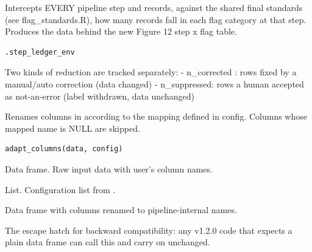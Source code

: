 \documentclass[a4paper]{book}
\begin{document}
%
\begin{Description}
Intercepts EVERY pipeline step and records, against the shared final
standards (see flag\_standards.R), how many records fall in each flag category
at that step. Produces the data behind the new Figure 12 step x flag table.
\end{Description}
%
\begin{Usage}
\begin{verbatim}
.step_ledger_env
\end{verbatim}
\end{Usage}
%
\begin{Details}
Two kinds of reduction are tracked separately:
- n\_corrected : rows fixed by a manual/auto correction (data changed)
- n\_suppressed: rows a human accepted as not-an-error (label withdrawn,
data unchanged)
\end{Details}
%
\begin{Description}
Renames columns in  according to the mapping defined in config.
Columns whose mapped name is NULL are skipped.
\end{Description}
%
\begin{Usage}
\begin{verbatim}
adapt_columns(data, config)
\end{verbatim}
\end{Usage}
%
\begin{Arguments}
\begin{ldescription}
\item[\code{data}] Data frame. Raw input data with user's column names.

\item[\code{config}] List. Configuration list from .
\end{ldescription}
\end{Arguments}
%
\begin{Value}
Data frame with columns renamed to pipeline-internal names.
\end{Value}
%
\begin{Description}
The escape hatch for backward compatibility: any v1.2.0 code that expects a
plain data frame can call this and carry on unchanged.
\end{Description}
\end{document}
